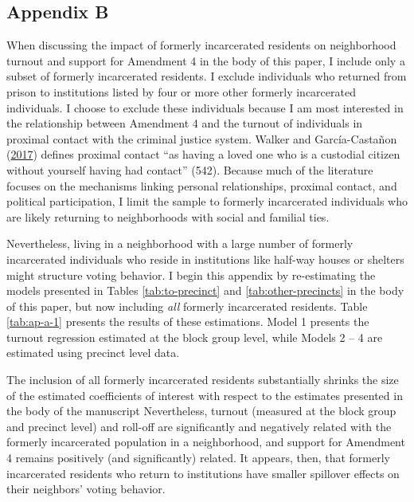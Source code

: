 \documentclass[
  12pt,
]{article}
\begin{document}
\newpage

\hypertarget{appendix-b}{%
\subsection*{Appendix B}\label{appendix-b}}

When discussing the impact of formerly incarcerated residents on neighborhood turnout and support for Amendment 4 in the body of this paper, I include only a subset of formerly incarcerated residents. I exclude individuals who returned from prison to institutions listed by four or more other formerly incarcerated individuals. I choose to exclude these individuals because I am most interested in the relationship between Amendment 4 and the turnout of individuals in proximal contact with the criminal justice system. Walker and García-Castañon (\protect\hyperlink{ref-Walker2017}{2017}) defines proximal contact ``as having a loved one who is a custodial citizen without yourself having had contact'' (542). Because much of the literature focuses on the mechanisms linking personal relationships, proximal contact, and political participation, I limit the sample to formerly incarcerated individuals who are likely returning to neighborhoods with social and familial ties.

Nevertheless, living in a neighborhood with a large number of formerly incarcerated individuals who reside in institutions like half-way houses or shelters might structure voting behavior. I begin this appendix by re-estimating the models presented in Tables \ref{tab:to-precinct} and \ref{tab:other-precincts} in the body of this paper, but now including \emph{all} formerly incarcerated residents. Table \ref{tab:ap-a-1} presents the results of these estimations. Model 1 presents the turnout regression estimated at the block group level, while Models 2 -- 4 are estimated using precinct level data.

\begin{singlespace}


\end{singlespace}

The inclusion of all formerly incarcerated residents substantially shrinks the size of the estimated coefficients of interest with respect to the estimates presented in the body of the manuscript Nevertheless, turnout (measured at the block group and precinct level) and roll-off are significantly and negatively related with the formerly incarcerated population in a neighborhood, and support for Amendment 4 remains positively (and significantly) related. It appears, then, that formerly incarcerated residents who return to institutions have smaller spillover effects on their neighbors' voting behavior.
\end{document}

